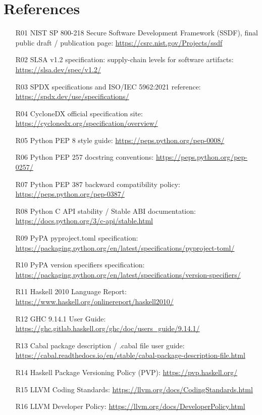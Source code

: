 \documentclass[11pt]{article}
\begin{document}
\section*{References}
\begin{itemize}
  \item [R01] NIST SP 800-218 Secure Software Development Framework (SSDF), final public draft / publication page: \url{https://csrc.nist.gov/Projects/ssdf}
  \item [R02] SLSA v1.2 specification: supply-chain levels for software artifacts: \url{https://slsa.dev/spec/v1.2/}
  \item [R03] SPDX specifications and ISO/IEC 5962:2021 reference: \url{https://spdx.dev/use/specifications/}
  \item [R04] CycloneDX official specification site: \url{https://cyclonedx.org/specification/overview/}
  \item [R05] Python PEP 8 style guide: \url{https://peps.python.org/pep-0008/}
  \item [R06] Python PEP 257 docstring conventions: \url{https://peps.python.org/pep-0257/}
  \item [R07] Python PEP 387 backward compatibility policy: \url{https://peps.python.org/pep-0387/}
  \item [R08] Python C API stability / Stable ABI documentation: \url{https://docs.python.org/3/c-api/stable.html}
  \item [R09] PyPA pyproject.toml specification: \url{https://packaging.python.org/en/latest/specifications/pyproject-toml/}
  \item [R10] PyPA version specifiers specification: \url{https://packaging.python.org/en/latest/specifications/version-specifiers/}
  \item [R11] Haskell 2010 Language Report: \url{https://www.haskell.org/onlinereport/haskell2010/}
  \item [R12] GHC 9.14.1 User Guide: \url{https://ghc.gitlab.haskell.org/ghc/doc/users\_guide/9.14.1/}
  \item [R13] Cabal package description / .cabal file user guide: \url{https://cabal.readthedocs.io/en/stable/cabal-package-description-file.html}
  \item [R14] Haskell Package Versioning Policy (PVP): \url{https://pvp.haskell.org/}
  \item [R15] LLVM Coding Standards: \url{https://llvm.org/docs/CodingStandards.html}
  \item [R16] LLVM Developer Policy: \url{https://llvm.org/docs/DeveloperPolicy.html}

\end{itemize}
\end{document}
